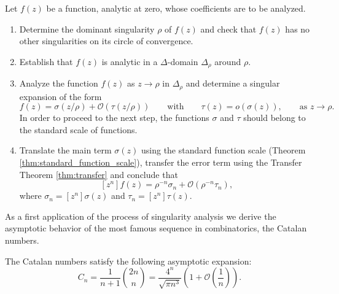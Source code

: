 \begin{proposition}
  Let $f(z)$ be a function, analytic at zero, whose coefficients are to be analyzed.
  \begin{enumerate}
    \item Determine the dominant singularity $\rho$ of $f(z)$ and check that $f(z)$ has no other singularities on its circle of convergence.
    \item Establish that $f(z)$ is analytic in a $\Delta$-domain $\Delta_\rho$ around $\rho$.
    \item Analyze the function $f(z)$ as $z \to \rho$ in $\Delta_\rho$ and determine a singular expansion of the form
    $$
      f(z) = \sigma(z/\rho) + \mathcal{O}(\tau(z/\rho)) 
      \qquad \text{with}
      \qquad \tau(z) = o(\sigma(z)),
      \qquad \text{as $z \to \rho$}.
    $$
    In order to proceed to the next step, the functions $\sigma$ and $\tau$ should belong to the standard scale of functions.
    \item Translate the main term $\sigma(z)$ using the standard function scale (Theorem \ref{thm:standard_function_scale}), transfer the error term using the Transfer Theorem \ref{thm:transfer} and conclude that
    $$
      [z^n] f(z) = \rho^{-n}\sigma_n + \mathcal{O}(\rho^{-n}\tau_n),
    $$
    where $\sigma_n = [z^n] \sigma(z)$ and $\tau_n = [z^n] \tau(z)$.
  \end{enumerate}
\end{proposition}

As a first application of the process of singularity analysis we derive the asymptotic behavior of the most famous sequence in combinatorics, the Catalan numbers.

\begin{corollary}
  The Catalan numbers satisfy the following asymptotic expansion: 
  $$
    C_n = \frac{1}{n+1}\binom{2n}{n} =  \frac{4^n}{\sqrt{\pi n^3}}\left(1 + \mathcal{O}\left(\frac{1}{n}\right)\right).
  $$
\end{corollary}

